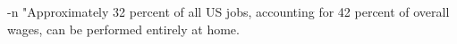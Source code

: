 -n "Approximately 32 percent of all US jobs, accounting for 42 percent of overall wages, can be performed entirely at home.%
